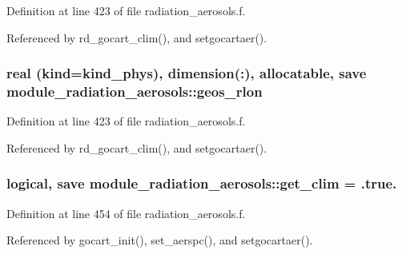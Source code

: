 Definition at line 423 of file radiation\+\_\+aerosols.\+f.



Referenced by rd\+\_\+gocart\+\_\+clim(), and setgocartaer().

\subsubsection[{\texorpdfstring{geos\+\_\+rlon}{geos_rlon}}]{\setlength{\rightskip}{0pt plus 5cm}real (kind=kind\+\_\+phys), dimension(\+:), allocatable, save module\+\_\+radiation\+\_\+aerosols\+::geos\+\_\+rlon\hspace{0.3cm}{\ttfamily [private]}}\hypertarget{namespacemodule__radiation__aerosols_a1a0e35ab33517e765898870b8b1ab1ad}{}\label{namespacemodule__radiation__aerosols_a1a0e35ab33517e765898870b8b1ab1ad}


Definition at line 423 of file radiation\+\_\+aerosols.\+f.



Referenced by rd\+\_\+gocart\+\_\+clim(), and setgocartaer().

\subsubsection[{\texorpdfstring{get\+\_\+clim}{get_clim}}]{\setlength{\rightskip}{0pt plus 5cm}logical, save module\+\_\+radiation\+\_\+aerosols\+::get\+\_\+clim = .true.\hspace{0.3cm}{\ttfamily [private]}}\hypertarget{namespacemodule__radiation__aerosols_a7fe1943010fe47c9d86ef4c993848459}{}\label{namespacemodule__radiation__aerosols_a7fe1943010fe47c9d86ef4c993848459}


Definition at line 454 of file radiation\+\_\+aerosols.\+f.



Referenced by gocart\+\_\+init(), set\+\_\+aerspc(), and setgocartaer().

